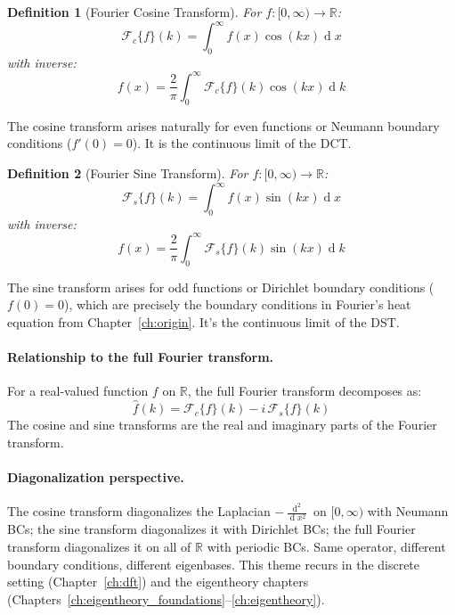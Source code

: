 \documentclass[12pt,a4paper]{report}
\DeclareMathOperator{\deriv}{d}
\theoremstyle{thms}
\theoremstyle{defns}
\newtheorem{definition}{Definition}[section]
\begin{document}
\begin{definition}[Fourier Cosine Transform]
    For $f: [0, \infty) \to \mathbb{R}$:
    \begin{equation}
        \mathcal{F}_c\{f\}(k) = \int_0^{\infty} f(x)\cos(kx)\deriv{x}
    \end{equation}
    with inverse:
    \begin{equation}
        f(x) = \dfrac{2}{\pi}\int_0^{\infty} \mathcal{F}_c\{f\}(k)\cos(kx)\deriv{k}
    \end{equation}
\end{definition}

The cosine transform arises naturally for even functions or Neumann boundary conditions ($f'(0) = 0$). It is the continuous limit of the DCT.

\begin{definition}[Fourier Sine Transform]
    For $f: [0, \infty) \to \mathbb{R}$:
    \begin{equation}
        \mathcal{F}_s\{f\}(k) = \int_0^{\infty} f(x)\sin(kx)\deriv{x}
    \end{equation}
    with inverse:
    \begin{equation}
        f(x) = \dfrac{2}{\pi}\int_0^{\infty} \mathcal{F}_s\{f\}(k)\sin(kx)\deriv{k}
    \end{equation}
\end{definition}

The sine transform arises for odd functions or Dirichlet boundary conditions ($f(0) = 0$), which are precisely the boundary conditions in Fourier's heat equation from Chapter~\ref{ch:origin}. It's the continuous limit of the DST.

\paragraph{Relationship to the full Fourier transform.} For a real-valued function $f$ on $\mathbb{R}$, the full Fourier transform decomposes as:
\begin{equation}
    \hat{f}(k) = \mathcal{F}_c\{f\}(k) - i\,\mathcal{F}_s\{f\}(k)
\end{equation}
The cosine and sine transforms are the real and imaginary parts of the Fourier transform.

\paragraph{Diagonalization perspective.} The cosine transform diagonalizes the Laplacian $-\frac{\deriv^2}{\deriv x^2}$ on $[0, \infty)$ with Neumann BCs; the sine transform diagonalizes it with Dirichlet BCs; the full Fourier transform diagonalizes it on all of $\mathbb{R}$ with periodic BCs. Same operator, different boundary conditions, different eigenbases. This theme recurs in the discrete setting (Chapter~\ref{ch:dft}) and the eigentheory chapters (Chapters~\ref{ch:eigentheory_foundations}--\ref{ch:eigentheory}).
\end{document}
